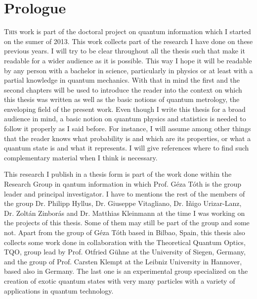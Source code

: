 \section*{Prologue}
\setcounter{page}{1}
\fancyfoot[LE,RO]{\thepage}

\lettrine[lines=2, findent=3pt,nindent=0pt]{T}{his} work is part of the doctoral project on quantum information which I started on the sumer of 2013.
This work collects part of the research I have done on these previous years.
I will try to be clear throughout all the thesis such that make it readable for a wider audience as it is possible.
This way I hope it will be readable by any person with a bachelor in science, particularly in physics or at least with a partial knowledge in quantum mechanics.
With that in mind the first and the second chapters will be used to introduce the reader into the context on which this thesis was written as well as the basic notions of quantum metrology, the enveloping field of the present work.
Even though I write this thesis for a broad audience in mind, a basic notion on quantum physics and statistics is needed to follow it properly as I said before.
For instance, I will assume among other things that the reader knows what probability is and which are its properties, or what a quantum state is and what it represents.
I will give references where to find such complementary material when I think is necessary.

This research I publish in a thesis form is part of the work done within the Research Group in qantum information in which Prof.
G\'eza T\'oth is the group leader and principal investigator.
I have to mentions the rest of the members of the group Dr. Philipp Hyllus, Dr. Giuseppe Vitagliano, Dr. I\~nigo Urizar-Lanz, Dr. Zolt\'an Zinbor\'as and Dr. Matthias Kleinmann at the time I was working on the projects of this thesis.
Some of them may still be part of the group and some not.
Apart from the group of G\'eza T\'oth based in Bilbao, Spain, this thesis also collects some work done in collaboration with the Theoretical Quantum Optics, TQO, group lead by Prof. Otfried G\"uhne at the University of Siegen, Germany, and the group of Prof. Carsten Klempt at the Leibniz University in Hannover, based also in Germany.
The last one is an experimental group specialized on the creation of exotic quantum states with very many particles with a variety of applications in quantum technology.

